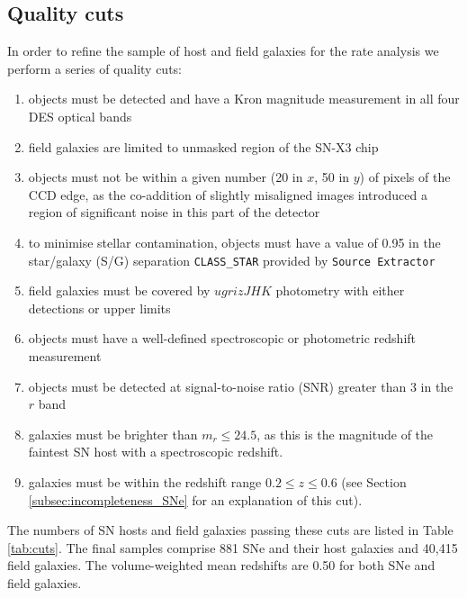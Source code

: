 \documentclass[fleqn,usenatbib]{mnras}
\begin{document}
\subsection{Quality cuts \label{subsec:cuts}}

In order to refine the sample of host and field galaxies for the rate analysis we perform a series of quality cuts:

\begin{enumerate}
    \item objects must be detected and have a Kron magnitude measurement in all four DES optical bands
    
    \item field galaxies are limited to unmasked region of the SN-X3 chip \citep{Hartley2020}
    
    \item objects must not be within a given number (20 in $x$, 50 in $y$) of pixels of the CCD edge, as the co-addition of slightly misaligned images introduced a region of significant noise in this part of the detector
    
    \item to minimise stellar contamination, objects must have a value of 0.95 in the star/galaxy (S/G) separation \texttt{CLASS\_STAR} provided by \texttt{Source Extractor} \citep{Bertin1996}
    
    \item field galaxies must be covered by $ugrizJHK$ photometry with either detections or upper limits
    
    \item objects must have a well-defined spectroscopic or photometric redshift measurement
    
    \item objects must be detected at signal-to-noise ratio (SNR) greater than 3 in the $r$ band
    
    \item galaxies must be brighter than $m_r \leq 24.5$, as this is the magnitude of the faintest SN host with a spectroscopic redshift.
    
    \item galaxies must be within the redshift range $0.2 \leq z \leq 0.6$ (see Section \ref{subsec:incompleteness_SNe} for an explanation of this cut).
\end{enumerate}

The numbers of SN hosts and field galaxies passing these cuts are listed in Table \ref{tab:cuts}. The final samples comprise 881 SNe and their host galaxies and 40,415 field galaxies. The volume-weighted mean redshifts are 0.50 for both SNe and field galaxies.
\end{document}
